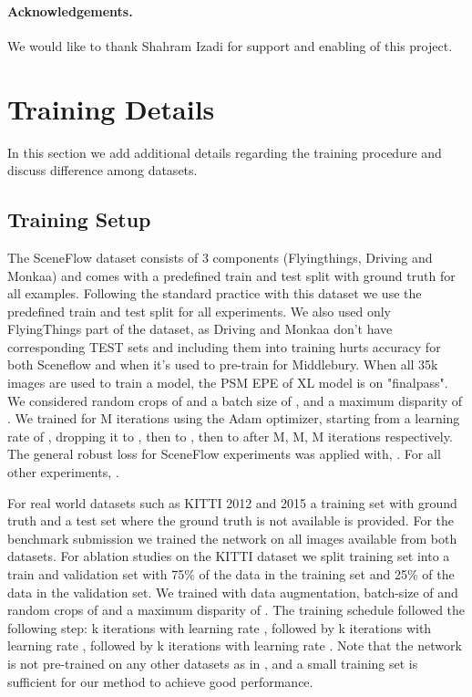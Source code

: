 \documentclass[final]{cvpr}
\begin{document}
\paragraph{Acknowledgements.} We would like to thank Shahram Izadi for support and enabling of this project. 

{\small


}

\clearpage

\appendix

\section{Training Details}
In this section we add additional details regarding the training procedure and discuss difference among datasets.

\subsection{Training Setup}
The SceneFlow dataset consists of 3 components (Flyingthings, Driving and Monkaa) and comes with a predefined train and test split with ground truth for all examples. Following the standard practice with this dataset we use the predefined train and test split for all experiments. We also used only FlyingThings part of the dataset, as Driving and Monkaa don't have corresponding TEST sets and including them into training hurts accuracy for both Sceneflow and when it's used to pre-train for Middlebury. When all 35k images are used to train a model, the PSM EPE of XL model is  on "finalpass".
We considered random crops of  and a batch size of , and a maximum disparity of . We trained for M iterations using the Adam optimizer, starting from a learning rate of , dropping it to , then to , then to  after M, M, M iterations respectively. 
The general robust loss for SceneFlow experiments was applied with, . For all other experiments, .


For real world datasets such as KITTI 2012 and 2015 a training set with ground truth and a test set where the ground truth is not available is provided. For the benchmark submission we trained the network on all  images available from both datasets. For ablation studies on the KITTI dataset we split training set into a train and validation set with 75\% of the data in the training set and 25\% of the data in the validation set.  We trained with data augmentation, batch-size of  and random crops of  and a maximum disparity of . The training schedule followed the following step: k iterations with learning rate , followed by k iterations with learning rate , followed by k iterations with learning rate . Note that the network is not pre-trained on any other datasets as in \cite{yang2019hierarchical}, and a small training set is sufficient for our method to achieve good performance. 
\end{document}
